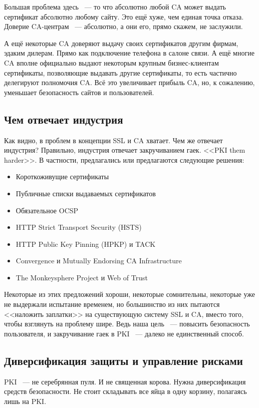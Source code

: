 \documentclass[10pt, a5paper]{article}
\begin{document}
Большая проблема здесь ~--- то что абсолютно любой CA может выдать
сертификат абсолютно любому сайту. Это ещё хуже, чем единая точка
отказа. Доверие CA-центрам ~--- абсолютно, а они его, прямо скажем,
не заслужили.

А ещё некоторые CA доверяют выдачу своих сертификатов другим фирмам,
эдаким дилерам. Прямо как подключение телефона в салоне связи. А ещё
многие CA вполне официально выдают некоторым крупным бизнес-клиентам
сертификаты, позволяющие выдавать другие сертификаты, то есть частично
делегируют полномочия CA. Всё это увеличивает прибыль CA, но,
к сожалению, уменьшает безопасность сайтов и пользователей.

\subsection*{Чем отвечает индустрия}

Как видно, в проблем в концепции SSL и CA хватает. Чем же отвечает
индустрия? Правильно, индустрия отвечает закручиванием гаек. <<PKI them
harder>>. В частности, предлагались или предлагаются следующие решения:

\begin{itemize}
  \item Короткоживущие сертификаты
  \item Публичные списки выдаваемых сертификатов
  \item Обязательное OCSP
  \item HTTP Strict Transport Security (HSTS)
  \item HTTP Public Key Pinning (HPKP) и TACK
  \item Convergence и Mutually Endorsing CA Infrastructure
  \item The Monkeysphere Project и Web of Trust
\end{itemize}

Некоторые из этих предложений хороши, некоторые сомнительны, некоторые
уже не выдержали испытание временем, но большинство из них пытаются
<<наложить заплатки>> на существующую систему SSL и CA, вместо того,
чтобы взглянуть на проблему шире. Ведь наша цель ~--- повысить безопасность
пользователя, и закручивание гаек в PKI ~--- далеко не единственный
способ.

\subsection*{Диверсификация защиты  и управление рисками}

PKI ~--- не серебрянная пуля. И не священная корова. Нужна диверсификация
средств безопасности. Не стоит складывать все яйца в одну корзину,
полагаясь лишь на PKI.
\end{document}
